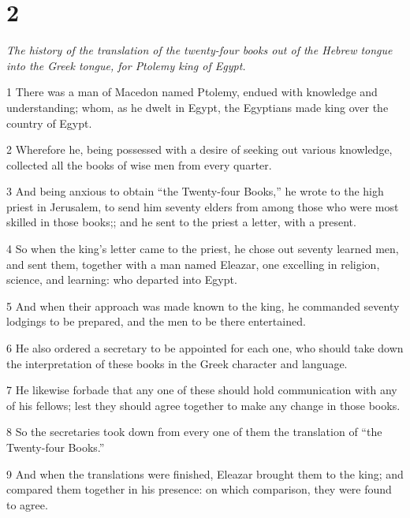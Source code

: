 \chapter{2}

\par \textit{The history of the translation of the twenty-four books out of the Hebrew tongue into the Greek tongue, for Ptolemy king of Egypt.}

\par 1 There was a man of Macedon named Ptolemy, endued with knowledge and understanding; whom, as he dwelt in Egypt, the Egyptians made king over the country of Egypt. 

\par 2 Wherefore he, being possessed with a desire of seeking out various knowledge, collected all the books of wise men from every quarter. 

\par 3 And being anxious to obtain “the Twenty-four Books,” he wrote to the high priest in Jerusalem, to send him seventy elders from among those who were most skilled in those books;; and he sent to the priest a letter, with a present. 

\par 4 So when the king’s letter came to the priest, he chose out seventy learned men, and sent them, together with a man named Eleazar, one excelling in religion, science, and learning: who departed into Egypt. 

\par 5 And when their approach was made known to the king, he commanded seventy lodgings to be prepared, and the men to be there entertained. 

\par 6 He also ordered a secretary to be appointed for each one, who should take down the interpretation of these books in the Greek character and language. 

\par 7 He likewise forbade that any one of these should hold communication with any of his fellows; lest they should agree together to make any change in those books. 

\par 8 So the secretaries took down from every one of them the translation of “the Twenty-four Books.” 

\par 9 And when the translations were finished, Eleazar brought them to the king; and compared them together in his presence: on which comparison, they were found to agree. 

